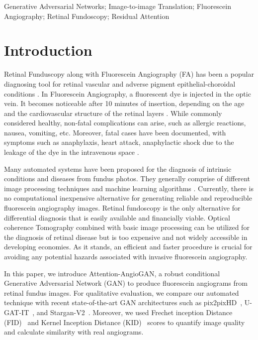 \documentclass[a4paper,conference]{IEEEtran}
\begin{document}
\begin{IEEEkeywords}
Generative Adversarial Networks; Image-to-image Translation; Fluorescein Angiography; Retinal Fundoscopy; Residual Attention
\end{IEEEkeywords}


\IEEEpeerreviewmaketitle



\section{Introduction}


Retinal Funduscopy along with Fluorescein Angiography (FA) has been a popular diagnosing tool for retinal vascular and adverse pigment epithelial-choroidal conditions \cite{mary2016retinal}. In Fluorescein Angiography, a fluorescent dye is injected in the optic vein. It becomes noticeable after 10 minutes of insertion, depending on the age and the cardiovascular structure of the retinal layers \cite{mandava2004fluorescein}. While commonly considered healthy, non-fatal complications can arise, such as allergic reactions, nausea, vomiting, etc. Moreover, fatal cases have been documented, with symptoms such as anaphylaxis, heart attack, anaphylactic shock due to the leakage of the dye in the intravenous space \cite{lira2007adverse,kwan2006fluorescein,kwiterovich1991frequency}.  






Many automated systems have been proposed for the diagnosis of intrinsic conditions and diseases from fundus photos. They generally comprise of different image processing techniques and machine learning algorithms \cite{gurudath2014machine,fu2018disc,poplin2018prediction,lira2007adverse}.  Currently, there is no computational inexpensive alternative for generating reliable and reproducible fluorescein angiography images. Retinal fundoscopy is the only alternative for differential diagnosis that is easily available and financially viable. Optical coherence Tomography combined with basic image processing\cite{opticnet19} can be utilized for the diagnosis of retinal disease but is too expensive and not widely accessible in developing economies. As it stands, an efficient and faster procedure is crucial for avoiding any potential hazards associated with invasive fluorescein angiography.

In this paper, we introduce Attention-AngioGAN, a robust conditional Generative Adversarial Network (GAN) to produce fluorescein angiograms from retinal fundus images. For qualitative evaluation, we compare our automated technique with recent state-of-the-art GAN architectures such as pix2pixHD~\cite{wang2018high}, U-GAT-IT~\cite{kim2019u}, and Stargan-V2~\cite{choi2020stargan}. Moreover, we used Frechet inception Distance (FID)~\cite{heusel2017gans} and Kernel Inception Distance (KID)~\cite{binkowski2018demystifying} scores to quantify image quality and calculate similarity with real angiograms. 
\end{document}

